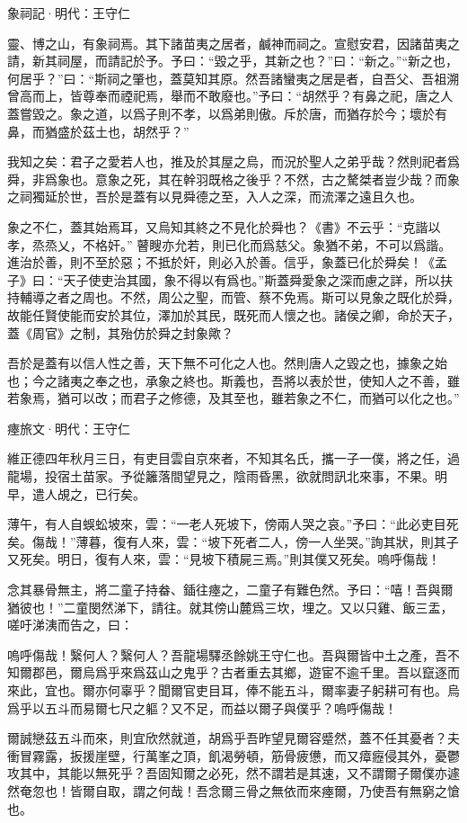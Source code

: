 \documentclass[12pt,a4paper]{ctexbook}
\begin{document}
象祠記·明代：王守仁 \par
靈、博之山，有象祠焉。其下諸苗夷之居者，鹹神而祠之。宣慰安君，因諸苗夷之請，新其祠屋，而請記於予。予曰：“毀之乎，其新之也？”曰：“新之。”“新之也，何居乎？”曰：“斯祠之肇也，蓋莫知其原。然吾諸蠻夷之居是者，自吾父、吾祖溯曾高而上，皆尊奉而禋祀焉，舉而不敢廢也。”予曰：“胡然乎？有鼻之祀，唐之人蓋嘗毀之。象之道，以爲子則不孝，以爲弟則傲。斥於唐，而猶存於今；壞於有鼻，而猶盛於茲土也，胡然乎？”\par
我知之矣：君子之愛若人也，推及於其屋之烏，而況於聖人之弟乎哉？然則祀者爲舜，非爲象也。意象之死，其在幹羽既格之後乎？不然，古之驁桀者豈少哉？而象之祠獨延於世，吾於是蓋有以見舜德之至，入人之深，而流澤之遠且久也。\par
象之不仁，蓋其始焉耳，又烏知其終之不見化於舜也？《書》不云乎：“克諧以孝，烝烝乂，不格奸。” 瞽瞍亦允若，則已化而爲慈父。象猶不弟，不可以爲諧。進治於善，則不至於惡；不抵於奸，則必入於善。信乎，象蓋已化於舜矣！《孟子》曰：“天子使吏治其國，象不得以有爲也。”斯蓋舜愛象之深而慮之詳，所以扶持輔導之者之周也。不然，周公之聖，而管、蔡不免焉。斯可以見象之既化於舜，故能任賢使能而安於其位，澤加於其民，既死而人懷之也。諸侯之卿，命於天子，蓋《周官》之制，其殆仿於舜之封象歟？\par
吾於是蓋有以信人性之善，天下無不可化之人也。然則唐人之毀之也，據象之始也；今之諸夷之奉之也，承象之終也。斯義也，吾將以表於世，使知人之不善，雖若象焉，猶可以改；而君子之修德，及其至也，雖若象之不仁，而猶可以化之也。”\par
瘞旅文·明代：王守仁 \par
維正德四年秋月三日，有吏目雲自京來者，不知其名氏，攜一子一僕，將之任，過龍場，投宿土苗家。予從籬落間望見之，陰雨昏黑，欲就問訊北來事，不果。明早，遣人覘之，已行矣。\par
薄午，有人自蜈蚣坡來，雲：“一老人死坡下，傍兩人哭之哀。”予曰：“此必吏目死矣。傷哉！”薄暮，復有人來，雲：“坡下死者二人，傍一人坐哭。”詢其狀，則其子又死矣。明日，復有人來，雲：“見坡下積屍三焉。”則其僕又死矣。嗚呼傷哉！\par
念其暴骨無主，將二童子持畚、鍤往瘞之，二童子有難色然。予曰：“嘻！吾與爾猶彼也！”二童閔然涕下，請往。就其傍山麓爲三坎，埋之。又以只雞、飯三盂，嗟吁涕洟而告之，曰：\par
嗚呼傷哉！繄何人？繄何人？吾龍場驛丞餘姚王守仁也。吾與爾皆中土之產，吾不知爾郡邑，爾烏爲乎來爲茲山之鬼乎？古者重去其鄉，遊宦不逾千里。吾以竄逐而來此，宜也。爾亦何辜乎？聞爾官吏目耳，俸不能五斗，爾率妻子躬耕可有也。烏爲乎以五斗而易爾七尺之軀？又不足，而益以爾子與僕乎？嗚呼傷哉！\par
爾誠戀茲五斗而來，則宜欣然就道，胡爲乎吾昨望見爾容蹙然，蓋不任其憂者？夫衝冒霧露，扳援崖壁，行萬峯之頂，飢渴勞頓，筋骨疲憊，而又瘴癧侵其外，憂鬱攻其中，其能以無死乎？吾固知爾之必死，然不謂若是其速，又不謂爾子爾僕亦遽然奄忽也！皆爾自取，謂之何哉！吾念爾三骨之無依而來瘞爾，乃使吾有無窮之愴也。\par
\end{document}
